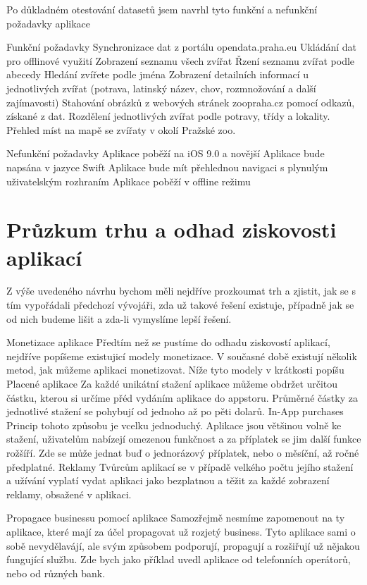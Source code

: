 \documentclass[thesis=B,czech]{FITthesis}[2012/06/26]
\begin{document}
Po důkladném otestování datasetů jsem navrhl tyto funkční a nefunkční požadavky aplikace

Funkční požadavky
Synchronizace dat z portálu opendata.praha.eu
Ukládání dat pro offlinové využití
Zobrazení seznamu všech zvířat
Řzení seznamu zvířat podle abecedy
Hledání zvířete podle jména
Zobrazení detailních informací u jednotlivých zvířat (potrava, latinský název, chov, rozmnožování a další zajímavosti)
Stahování obrázků z webových stránek zoopraha.cz pomocí odkazů, získané z dat.
Rozdělení jednotlivých zvířat podle potravy, třídy a lokality.
Přehled míst na mapě se zvířaty v okolí Pražské zoo.


Nefunkční požadavky
Aplikace poběží na iOS 9.0 a novější
Aplikace bude napsána v jazyce Swift 
Aplikace bude mít přehlednou navigaci s plynulým uživatelským rozhraním
Aplikace poběží v offline režimu


\chapter{Průzkum trhu a odhad ziskovosti aplikací}
Z výše uvedeného návrhu bychom měli nejdříve prozkoumat trh a zjistit, jak se s tím vypořádali předchozí vývojáři, zda už takové řešení existuje, případně jak se od nich budeme lišit a zda-li vymyslíme lepší řešení.

Monetizace aplikace
Předtím než se pustíme do odhadu ziskovostí aplikací, nejdříve popíšeme existujicí modely monetizace. V současné době existují několik metod, jak můžeme aplikaci monetizovat. Níže tyto modely v krátkosti popíšu
Placené aplikace
Za každé unikátní stažení aplikace můžeme obdržet určitou částku, kterou si určíme přéd vydáním aplikace do appstoru. Průměrné částky za jednotlivé stažení se pohybují od jednoho až po pěti dolarů.
In-App purchases
Princip tohoto způsobu je vcelku jednoduchý. Aplikace jsou většinou volně ke stažení, uživatelům nabízejí omezenou funkčnost a za příplatek se jim další funkce rožšíří. Zde se může jednat buď o jednorázový příplatek, nebo o měsíční, až ročné předplatné. 
Reklamy
Tvůrcům aplikací se v případě velkého počtu jejího stažení a užívání vyplatí vydat aplikaci jako bezplatnou a těžit za každé zobrazení reklamy, obsažené v aplikaci.

Propagace businessu pomocí aplikace
Samozřejmě nesmíme zapomenout na ty aplikace, které mají za účel propagovat už rozjetý business. Tyto aplikace sami o sobě nevydělavájí, ale svým způsobem podporují, propagují a rozšiřují už nějakou fungující službu. Zde bych jako příklad uvedl aplikace od telefonních operátorů, nebo od různých bank.
\end{document}

